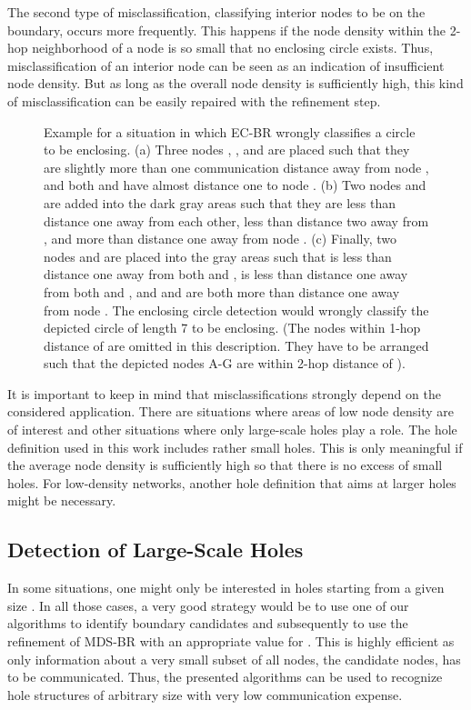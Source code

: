 \documentclass{llncs}
\begin{document}
The second type of misclassification, classifying interior nodes to be on the boundary, occurs more frequently. This happens if the node density within the 2-hop neighborhood of a node is so small that no enclosing circle exists. Thus, misclassification of an interior node can be seen as an indication of insufficient node density. 
But as long as the overall node density is sufficiently high, this kind of misclassification can be easily repaired with the refinement step.

\begin{figure}[t]
\centering
\hfill
{}
\hfill
{}
\hfill
{}
\hfill\hspace{0em}
\caption{
Example for a situation in which EC-BR wrongly classifies a circle to be enclosing. 
(a) Three nodes , , and  are placed such that they are slightly more than one communication distance away from node , and both  and  have almost distance one to node .
(b) Two nodes  and  are added into the dark gray areas such that they are less than distance one away from each other, less than distance two away from , and more than distance one away from node .
(c) Finally, two nodes  and  are placed into the gray areas such that  is less than distance one away from both  and ,  is less than distance one away from both  and , and  and  are both more than distance one away from node . The enclosing circle detection would wrongly classify the depicted circle of length 7 to be enclosing. (The nodes within 1-hop distance of  are omitted in this description. They have to be arranged such that the depicted nodes A-G are within 2-hop distance of ). 
}
\label{fig:ecbr_guarantee}
\end{figure}

It is important to keep in mind that misclassifications strongly depend on the considered application. There are situations where areas of low node density are of interest and other situations where only large-scale holes play a role. The hole definition used in this work includes rather small holes. This is only meaningful if the average node density is sufficiently high so that there is no excess of small holes. For low-density networks, another hole definition that aims at larger holes might be necessary. 

\subsection{Detection of Large-Scale Holes}
In some situations, one might only be interested in holes starting from a given size .
In all those cases, a very good strategy would be to use one of our algorithms to identify boundary candidates and subsequently to use the refinement of MDS-BR with an appropriate value for .
This is highly efficient as only information about a very small subset of all nodes, the candidate nodes, has to be communicated.
Thus, the presented algorithms can be used to recognize hole structures of arbitrary size with very low communication expense.
\end{document}
